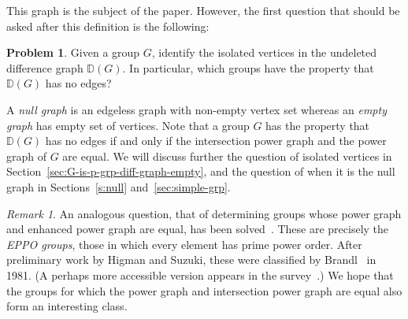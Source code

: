 \documentclass[12pt]{amsart}
\theoremstyle{plain}
\theoremstyle{remark}
\newtheorem{remark}[theorem]{Remark}
\theoremstyle{definition}
\newtheorem{problem}{Problem}[section]
\begin{document}

This graph is the subject of the paper. However, the first question that should
be asked after this definition is the following:

\begin{problem}
Given a group $G$, identify the isolated vertices in the undeleted difference graph $\mathbb{D}(G)$. In
particular, which groups have the property that $\mathbb{D}(G)$ has no
edges?
\end{problem}
A \emph{null graph} is an edgeless graph with non-empty vertex
set whereas an \emph{empty graph} has empty set of vertices.  
Note that a group $G$ has the property that $\mathbb{D}(G)$
has no edges if and only if the intersection power graph and the power graph of $G$
are equal. We will discuss further the question of isolated vertices in 
Section~\ref{sec:G-is-p-grp-diff-graph-empty}, and the question of when it is
the null graph in Sections~\ref{s:null} and~\ref{sec:simple-grp}.

\begin{remark}
An analogous question, that of determining groups whose power graph and
enhanced power graph are equal, has been solved~\cite{aacns}. These are
precisely the \emph{EPPO groups}, those in which every element has prime
power order. After preliminary work by Higman and Suzuki, these were
classified by Brandl~\cite{Brandl} in 1981. (A perhaps more accessible version
appears in the survey~\cite{cm}.) We hope that the groups for 
which the power graph and intersection power graph are equal also form an
interesting class.
\end{remark}
\end{document}
